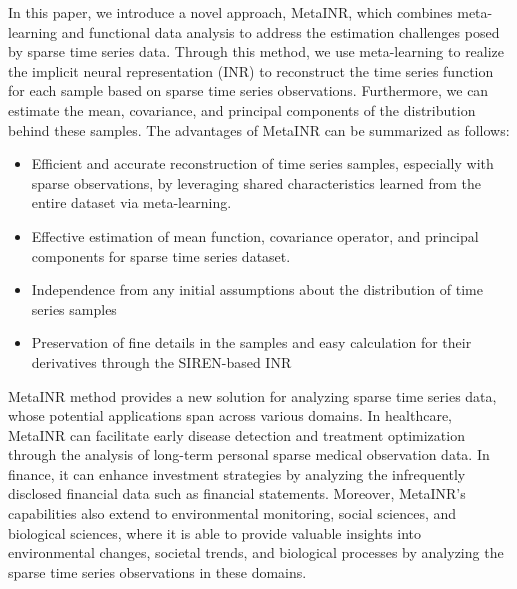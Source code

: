 \documentclass{article}
\begin{document}
In this paper, we introduce a novel approach, MetaINR, which combines meta-learning and functional data analysis to address the estimation challenges posed by sparse time series data. 
Through this method, we use meta-learning to realize the implicit neural representation (INR) to
reconstruct the time series function for each sample based on sparse time series observations.
Furthermore, we can estimate the mean, covariance, and principal components of the distribution behind these samples.
The advantages of MetaINR can be summarized as follows:
  \begin{itemize}
    \item Efficient and accurate reconstruction of time series samples, especially with sparse observations, by leveraging shared characteristics learned from the entire dataset via meta-learning.
    \item Effective estimation of mean function, covariance operator, and principal components for sparse time series dataset.
    \item Independence from any initial assumptions about the distribution of time series samples
    \item Preservation of fine details in the samples and easy calculation for their derivatives through the SIREN-based INR
  \end{itemize}

MetaINR method provides a new solution for analyzing sparse time series data,
whose potential applications span across various domains.
In healthcare, MetaINR can facilitate early disease detection and treatment optimization through the analysis of long-term personal sparse medical observation data.
In finance, it can enhance investment strategies by analyzing the infrequently disclosed financial data such as financial statements. 
Moreover, MetaINR's capabilities also extend to environmental monitoring, social sciences, and biological sciences, where it is able to provide valuable insights into environmental changes, societal trends, and biological processes by analyzing the sparse time series observations in these domains. 


\end{document}
